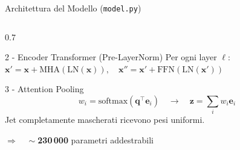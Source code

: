 \documentclass[aspectratio=169, 10pt]{beamer}
\begin{document}
\begin{frame}{Architettura del Modello (\texttt{model.py})}
\begin{columns}[T]
\begin{column}{0.7\textwidth}
            \begin{block}{2 - Encoder Transformer (Pre-LayerNorm)}
                Per ogni layer $\ell$:
                \(
                    \mathbf{x}' = \mathbf{x} + \mathrm{MHA}(\mathrm{LN}(\mathbf{x})),
                    \quad
                    \mathbf{x}'' = \mathbf{x}' + \mathrm{FFN}(\mathrm{LN}(\mathbf{x}'))
                \)
            \end{block}
            \begin{block}{3 - Attention Pooling}
                \[
                    w_i = \mathrm{softmax}(\mathbf{q}^\top \mathbf{e}_i)
                    \quad \to \quad
                    \mathbf{z} = \sum_i w_i \mathbf{e}_i
                \]
                Jet completamente mascherati ricevono pesi uniformi.
            \end{block}
            \begin{alertblock}{}
                \centering
                $\Rightarrow \quad \sim$\textbf{230\,000} parametri addestrabili
            \end{alertblock}
        \end{column}
    \end{columns}
\end{frame}
\end{document}
